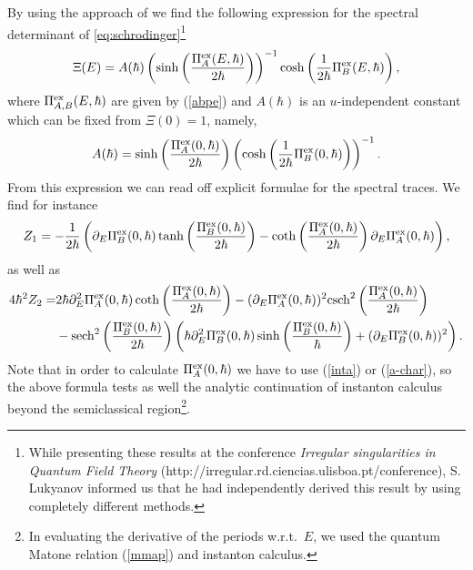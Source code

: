 \documentclass[a4paper,11pt]{article}
\theoremstyle{definition}
\newcommand{\be}{\begin{equation}}
\newcommand{\ee}{\end{equation}}
\newcommand{\ba}{\begin{aligned}}
\newcommand{\ea}{\end{aligned}}
\begin{document}
By using the approach of \cite{ghm,gm3} we find the following expression 
for the spectral determinant of \eqref{eq:schrodinger}\footnote{While presenting these 
results at the conference {\it Irregular singularities in Quantum Field Theory} (http://irregular.rd.ciencias.ulisboa.pt/conference),   	
S. Lukyanov informed us that he had independently derived this result \cite{PCL} by using completely different methods. }
%
\be 
\label{sd}\Xi(E)=A (\hbar) \left( \sinh\left(\frac{ \Pi_A^{\rm ex}(E, \hbar)}{2 \hbar }\right) \right)^{-1} \cosh\left({1 \over 2\hbar} \Pi_B^{\rm ex}(E, \hbar)\right), 
\ee
%
where $\Pi_{A,B}^{\rm ex} (E, \hbar)$ are given by (\ref{abpe}) and $A(\hbar) $ is an $u$-independent constant which can be fixed from $\Xi(0)=1$, namely, 
%
 \be\label{ainst} A(\hbar) =  \sinh\left(\frac{ \Pi_A^{\rm ex}(0, \hbar)}{2 \hbar }\right)  \left(\cosh\left({1 \over 2\hbar} \Pi_B^{\rm ex}(0, \hbar)\right)\right)^{-1}.\ee
From this expression we can read off explicit formulae for the spectral traces. We find for instance 
%
\be \label{tr1} Z_1=-{1\over 2 \hbar}\left(\partial_E\Pi_B^{\rm ex}(0, \hbar) \tanh \left( {\Pi_B^{\rm ex}(0, \hbar)}\over 2 \hbar\right)-  \coth \left(\frac{\Pi_A^{\rm ex}(0, \hbar)}{2 \hbar }\right)   \partial_E \Pi_A^{\rm ex}(0, \hbar)\right)      ,\ee
%
as well as
%
\be \ba \label{tr2} 4 \hbar^2 Z_2= & 2 \hbar \partial_E^2\Pi_A^{\rm ex}(0,\hbar) \coth \left(\frac{\Pi_A^{\rm ex}(0,\hbar)}{2 \hbar }\right)-(\partial_E\Pi_A^{\rm ex}(0,\hbar))^2 \text{csch}^2\left(\frac{\Pi_A^{\rm ex}(0,\hbar)}{2 \hbar }\right)\\
&-\text{sech}^2\left(\frac{\Pi_B^{\rm ex}(0,\hbar)}{2 \hbar }\right) \left(\hbar  \partial_E^2 \Pi_B^{\rm ex}(0,\hbar) \sinh \left(\frac{\Pi_B^{\rm ex}(0,\hbar)}{\hbar }\right)
+(\partial_E \Pi_B^{\rm ex}(0,\hbar))^2\right). 
\ea
 \ee
 Note that in order to calculate $\Pi_A^{\rm ex}(0,\hbar)$ we have to use (\ref{inta}) or (\ref{a-char}), so the above formula tests as well the analytic continuation of instanton calculus beyond the semiclassical region\footnote{In evaluating the derivative of the periods w.r.t.~$E$, we used the quantum Matone relation (\ref{mmap}) and instanton 
 calculus. }.  
\end{document}
